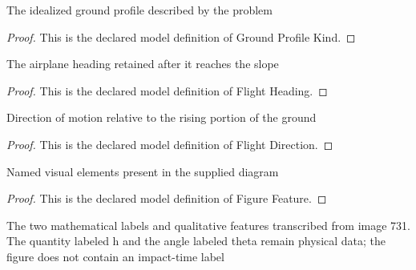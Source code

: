\begin{definition}
  \label{def:physics:phyx-mini-0731:phyxminiproblems-problemphyxmini0731-groundprofilekind}
  The idealized ground profile described by the problem
\end{definition}
\begin{proof}
  This is the declared model definition of Ground Profile Kind.
\end{proof}
\begin{definition}
  \label{def:physics:phyx-mini-0731:phyxminiproblems-problemphyxmini0731-flightheading}
  The airplane heading retained after it reaches the slope
\end{definition}
\begin{proof}
  This is the declared model definition of Flight Heading.
\end{proof}
\begin{definition}
  \label{def:physics:phyx-mini-0731:phyxminiproblems-problemphyxmini0731-flightdirection}
  Direction of motion relative to the rising portion of the ground
\end{definition}
\begin{proof}
  This is the declared model definition of Flight Direction.
\end{proof}
\begin{definition}
  \label{def:physics:phyx-mini-0731:phyxminiproblems-problemphyxmini0731-figurefeature}
  Named visual elements present in the supplied diagram
\end{definition}
\begin{proof}
  This is the declared model definition of Figure Feature.
\end{proof}
\begin{definition}
  \label{def:physics:phyx-mini-0731:phyxminiproblems-problemphyxmini0731-risinggroundfigure}
  The two mathematical labels and qualitative features transcribed from image 731. The quantity labeled h and the angle labeled theta remain physical data; the figure does not contain an impact-time label
\end{definition}
